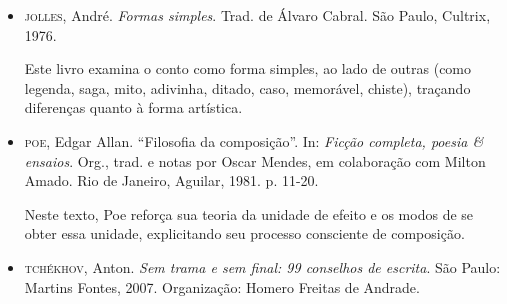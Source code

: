 \documentclass[11pt]{extarticle}
\begin{document}
\begin{itemize}
\item\textsc{jolles}, André. \emph{Formas simples}. Trad. de Álvaro Cabral. São Paulo,
Cultrix, 1976. 

Este livro examina o conto como forma simples, ao
lado de outras (como legenda, saga, mito, adivinha, ditado, caso,
memorável, chiste), traçando diferenças quanto à forma artística.

\item\textsc{poe}, Edgar Allan. ``Filosofia da composição''. In: \emph{Ficção
completa, poesia \& ensaios}. Org., trad. e notas por Oscar Mendes, em
colaboração com Milton Amado. Rio de Janeiro, Aguilar, 1981. p. 11-20.


Neste texto, Poe reforça sua teoria da unidade de efeito e os modos
de se obter essa unidade, explicitando seu processo consciente de
composição.

\item\textsc{tchékhov}, Anton. \emph{Sem trama e sem final: 99 conselhos de escrita}.
São Paulo: Martins Fontes, 2007. Organização: Homero Freitas de Andrade.
\end{itemize}
\end{document}
